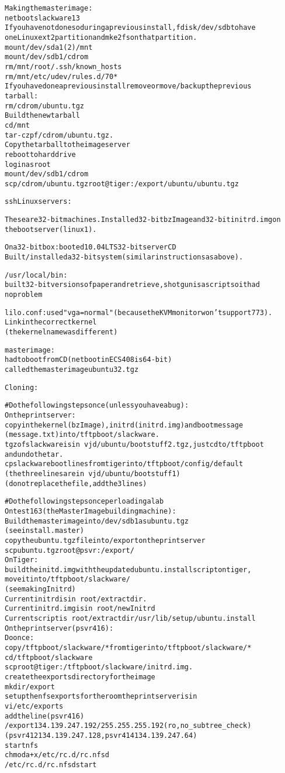 \begin{alltt}
Making the master image:
 netboot slackware 13
 If you have not done so during a previous install, fdisk /dev/sdb to have
  one Linux ext2 partition and mke2fs on that partition.
 mount /dev/sda1(2) /mnt
 mount /dev/sdb1 /cdrom
 rm /mnt/root/.ssh/known_hosts
 rm /mnt/etc/udev/rules.d/70*
  If you have done a previous install remove or move/backup the previous
  tarball:
 rm /cdrom/ubuntu.tgz
  Build the new tarball
 cd /mnt
 tar -czpf /cdrom/ubuntu.tgz .
  Copy the tarball to the image server
 reboot to hard drive
 login as root
 mount /dev/sdb1 /cdrom
 scp /cdrom/ubuntu.tgz root@tiger:/export/ubuntu/ubuntu.tgz

ssh Linux servers:

  These are 32-bit machines. Installed 32-bit bzImage and 32-bit initrd.img on
  the boot server (linux1).

  On a 32-bit box: booted 10.04 LTS 32-bit server CD
  Built/installed a 32-bit system (similar instructions as above).

  /usr/local/bin:
   built 32-bit versions of paper and retrieve, shotgun is a script so it had
    no problem

  lilo.conf: used "vga = normal" (because the KVM monitor won't support 773).
   Link in the correct kernel
     (the kernel name was different)


  master image:
   had to boot from CD (netboot in ECS 408 is 64-bit)
   called the master image ubuntu32.tgz

Cloning:

# Do the following steps once (unless you have a bug):
On the print server:
  copy in the kernel (bzImage), initrd (initrd.img) and boot message
   (message.txt) into /tftpboot/slackware.
   tgz of slackware is in ~vjd/ubuntu/bootstuff2.tgz, just cd to /tftpboot
   and undo the tar.
 cp slackware boot lines from tiger into /tftpboot/config/default
  (the three lines are in ~vjd/ubuntu/bootstuff1)
  (do not replace the file, add the 3 lines)

# Do the following steps once per loading a lab
On test163 (the Master Image building machine):
  Build the master image into /dev/sdb1 as ubuntu.tgz
   (see install.master)
  copy  the ubuntu.tgz file into /export on the printserver
   scp ubuntu.tgz root@psvr:/export/
On Tiger:
  build the initd.img with the updated ubuntu.install script on tiger,
   move it into /tftpboot/slackware/
   (see makingInitrd)
   Current initrd is in ~root/extractdir.
   Current initrd.img is in ~root/newInitrd
   Current script is ~root/extractdir/usr/lib/setup/ubuntu.install
On the print server (psvr416):
 Do once:
  copy /tftpboot/slackware/* from tiger into /tftpboot/slackware/*
   cd /tftpboot/slackware
   scp root@tiger:/tftpboot/slackware/initrd.img .
  create the exports directory for the image
   mkdir /export
  setup the nfs exports for the room the printserver is in
   vi /etc/exports
    add the line (psvr416)
     /export 134.139.247.192/255.255.255.192(ro,no_subtree_check)
      (psvr412 134.139.247.128, psvr414 134.139.247.64)
   start nfs
     chmod a+x /etc/rc.d/rc.nfsd
     /etc/rc.d/rc.nfsd start
   

\end{alltt}
